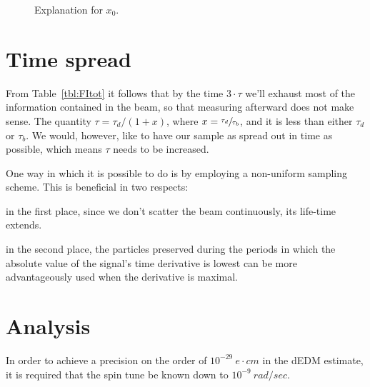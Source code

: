 \documentclass{article}
\newcommand{\LTb}{\tau_b}
\newcommand{\LTd}{\tau_d}
\begin{document}
\begin{figure}[h]
	\centering
	\caption{Explanation for $x_0$\label{fig:x0Expl}.}
\end{figure}

\section{Time spread}

From Table~\ref{tbl:FItot} it follows that by the time $3\cdot \tau$ we'll exhaust most of the information contained in the beam, so that measuring afterward does not make sense. The quantity $\tau = \LTd/(1+x)$, where $x=\sfrac{\LTd}{\LTb}$, and it is less than either $\LTd$ or $\LTb$. We would, however, like to have our sample as spread out in time as possible, which means $\tau$ needs to be increased.

One way in which it is possible to do is by employing a non-uniform sampling scheme. This is beneficial in two respects:
\begin{inparaenum}[1)]
	\item in the first place, since we don't scatter the beam continuously, its life-time extends.
	\item in the second place, the particles preserved during the periods in which the absolute value of the signal's time derivative is lowest can be more advantageously used when the derivative is maximal.
\end{inparaenum} 


\section{Analysis}

In order to achieve a precision on the order of $10^{-29}~e\cdot cm$ in the dEDM estimate, it is required that the spin tune be known down to $10^{-9}~rad/sec$. 
\end{document}
